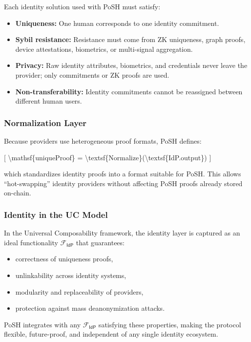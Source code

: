 \documentclass{article}
\begin{document}
Each identity solution used with PoSH must satisfy:

\begin{itemize}
\item \textbf{Uniqueness:} One human corresponds to one identity commitment.
\item \textbf{Sybil resistance:} Resistance must come from ZK uniqueness,
graph proofs, device attestations, biometrics, or multi-signal
aggregation.
\item \textbf{Privacy:} Raw identity attributes, biometrics, and credentials
never leave the provider; only commitments or ZK proofs are used.
\item \textbf{Non-transferability:} Identity commitments cannot be reassigned
between different human users.
\end{itemize}

\subsubsection{Normalization Layer}

Because providers use heterogeneous proof formats, PoSH defines:

[
{\textbackslash}mathsf\{uniqueProof\} = {\textbackslash}textsf\{Normalize\}({\textbackslash}textsf\{IdP.output\})
]

which standardizes identity proofs into a format suitable for PoSH. This allows
``hot-swapping'' identity providers without affecting PoSH proofs already stored
on-chain.

\subsubsection{Identity in the UC Model}

In the Universal Composability framework, the identity layer is captured as an
ideal functionality $\mathcal{F}_{\textsf{IdP}}$ that guarantees:

\begin{itemize}
\item correctness of uniqueness proofs,
\item unlinkability across identity systems,
\item modularity and replaceability of providers,
\item protection against mass deanonymization attacks.
\end{itemize}

PoSH integrates with any $\mathcal{F}_{\textsf{IdP}}$ satisfying these
properties, making the protocol flexible, future-proof, and independent of any
single identity ecosystem.
\end{document}
